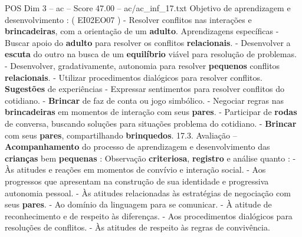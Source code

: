 \begin{textsample}{POS Dim 3 – ac – Score 47.00 – ac/ac\_inf\_17.txt}
Objetivo de aprendizagem e desenvolvimento : ( EI02EO07 ) - Resolver conflitos nas interações e \textbf{brincadeiras}, com a orientação de um \textbf{adulto}.
Aprendizagens específicas - Buscar apoio do \textbf{adulto} para resolver os conflitos \textbf{relacionais}. - Desenvolver a \textbf{escuta} do outro na busca de um \textbf{equilíbrio} viável para resolução de problemas. - Desenvolver, gradativamente, autonomia para resolver \textbf{pequenos} conflitos \textbf{relacionais}. - Utilizar procedimentos dialógicos para resolver conflitos. \textbf{Sugestões} de experiências - Expressar sentimentos para resolver conflitos do cotidiano. - \textbf{Brincar} de faz de conta ou jogo simbólico. - Negociar regras nas \textbf{brincadeiras} em momentos de interação com seus \textbf{pares}. - Participar de \textbf{rodas} de conversa, buscando soluções para situações problema do cotidiano. - \textbf{Brincar} com seus \textbf{pares}, compartilhando \textbf{brinquedos}. 17.3.
Avaliação – \textbf{Acompanhamento} do processo de aprendizagem e desenvolvimento das \textbf{crianças} bem \textbf{pequenas} : Observação \textbf{criteriosa}, \textbf{registro} e análise quanto : - Às atitudes e reações em momentos de convívio e interação social. - Aos progressos que apresentam na construção de sua identidade e progressiva autonomia pessoal. - Às atitudes relacionadas às estratégias de negociação com seus \textbf{pares}. - Ao domínio da linguagem para se comunicar. - À atitude de reconhecimento e de respeito às diferenças. - Aos procedimentos dialógicos para resoluções de conflitos. - Às atitudes de respeito às regras de convivência.

\end{textsample}
